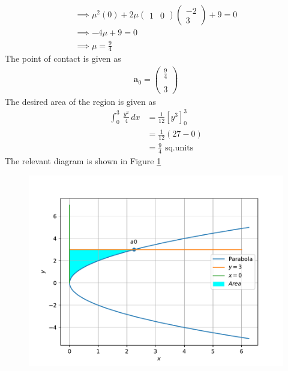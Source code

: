 \documentclass[12pt]{article}
\providecommand{\brak}[1]{\ensuremath{\left(#1\right)}}
\providecommand{\sbrak}[1]{\ensuremath{{}\left[#1\right]}}
\newcommand{\myvec}[1]{\ensuremath{\begin{pmatrix}#1\end{pmatrix}}}
\let\vec\mathbf
\begin{document}
\begin{enumerate}
\begin{multline}
	\implies \mu^2\brak{0}+2\mu\myvec{1 & 0}\myvec{-2 \\3} + 9 = 0 \\
	\implies -4\mu + 9 = 0  \\
	\implies \mu  = \frac{9}{4} 
\end{multline}
The point of contact is given as
\begin{align}
	\vec{a}_0 = \myvec{\frac{9}{4}  \\[1pt] \\ 3}
\end{align}
The desired area of the region is given as
\begin{align}
	\int_{0}^{3} \ \frac{y^2}{4} \,dx &= \frac{1}{12}\sbrak{y^3}_{0}^{3} \\
	&= \frac{1}{12}\brak{27-0} \\
	&= \frac{9}{4} \text{ sq.units}
\end{align}
The relevant diagram is shown in Figure \ref{fig:Fig1}
\begin{figure}[!h]
	\begin{center}
		\includegraphics[width=\columnwidth]{figs/problem13.pdf}
	\end{center}
\caption{}
\label{fig:Fig1}
\end{figure}
\end{enumerate}
\end{document}
